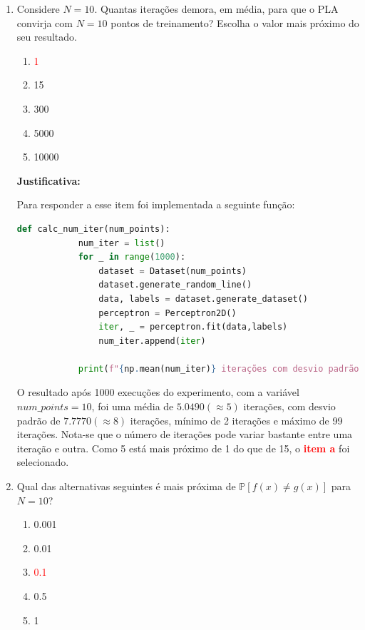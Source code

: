 \begin{enumerate}
    \item Considere $N = 10$. Quantas iterações demora, em média, para que o PLA convirja com $N = 10$
    pontos de treinamento? Escolha o valor mais próximo do seu resultado.

    \begin{enumerate}
        \item[\textcolor{red}{(a)}]\textcolor{red}{1}\addtocounter{enumii}{1}
        \item 15
        \item 300
        \item 5000
        \item 10000
    \end{enumerate}
     
    \par

    \textbf{Justificativa:}

    Para responder a esse item foi implementada a seguinte função:

    \begin{lstlisting}[language=Python, caption=Cálculo do número de iterações, label=cod:perceptron_num_iter]
        def calc_num_iter(num_points):
            num_iter = list()
            for _ in range(1000):
                dataset = Dataset(num_points)
                dataset.generate_random_line()
                data, labels = dataset.generate_dataset()
                perceptron = Perceptron2D()
                iter, _ = perceptron.fit(data,labels)
                num_iter.append(iter)
        
            print(f"{np.mean(num_iter)} iterações com desvio padrão {np.std(num_iter):.4f} (min:{np.min(num_iter)}, máx:{np.max(num_iter)})")
    \end{lstlisting}

    O resultado após 1000 execuções do experimento, com a variável $num\_points = 10$, foi uma média de $5.0490(\approx 5)$ iterações, com desvio padrão de $7.7770(\approx 8)$ iterações, mínimo de 2 iterações e máximo de 99 iterações. Nota-se que o número de iterações pode variar bastante entre uma iteração e outra. Como 5 está mais próximo de 1 do que de 15, o \textcolor{red}{\textbf{item a}} foi selecionado. 
    
    \item Qual das alternativas seguintes é mais próxima de $\mathbb{P}[f(x) \neq g(x)]$ para $N = 10$?
    
    \begin{enumerate}
        \item 0.001
        \item 0.01
        \item[\textcolor{red}{(c)}]\textcolor{red}{0.1}\addtocounter{enumii}{1}
        \item 0.5
        \item 1
    \end{enumerate}
     

\end{enumerate}
